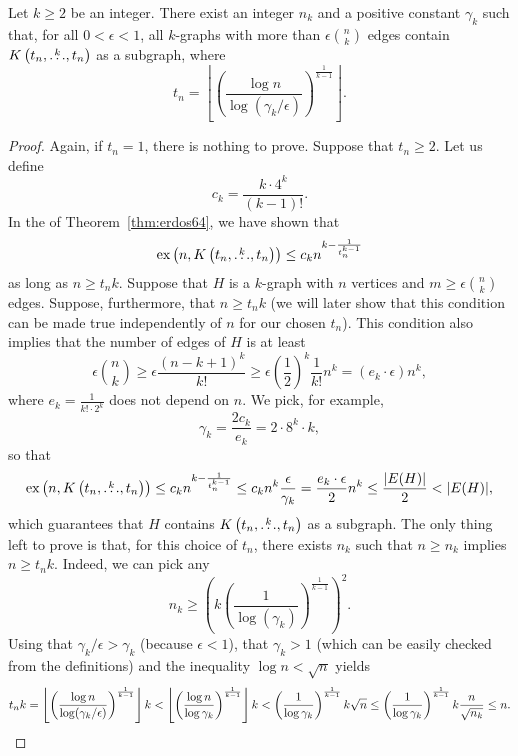 \begin{theorem} \label{thm:erdos64-constant-density}
    Let $k \geq 2$ be an integer.
    There exist an integer $n_k$ and a positive constant $\gamma_k$
    such that, for all
    $0 < \epsilon < 1$,
    all $k$-graphs with more than $\epsilon \binom{n}{k}$ edges
    contain $K\left(t_n, \overset{k}{\dots}, t_n\right)$ as a subgraph, where
    \[
        t_n = \left\lfloor \left( \frac{\log n}{\log(\gamma_k/\epsilon)} \right)^{\frac{1}{k-1}} \right\rfloor.
    \]
    \begin{proof}
        Again, if $t_n=1$, there is nothing to prove.
        Suppose that $t_n \geq 2$.
        Let us define
        \[
            c_k = \frac{k \cdot 4^k}{(k-1)!}.
        \]
        In the  of Theorem~\ref{thm:erdos64}, we have shown that
        \[
            \text{ex} \left( n, K\left(t_n, \overset{k}{\dots}, t_n\right) \right) \leq c_k n^{k - \frac{1}{t_n^{k-1}}}
        \]
        as long as $n \geq t_n k$.
        Suppose that $H$ is a $k$-graph with $n$ vertices and $m \geq \epsilon \binom{n}{k}$ edges.
        Suppose, furthermore, that $n \geq t_n k$
        (we will later show that this condition can be made true independently of $n$ for our chosen $t_n$).
        This condition also implies that the number of edges of $H$ is at least
        \[
            \epsilon \binom{n}{k} \geq \epsilon \frac{(n - k + 1)^k}{k!} \geq \epsilon \left( \frac{1}{2} \right)^k \frac{1}{k!} n^{k} = (e_k  \cdot \epsilon) n^{k},
        \]
        where $e_k = \frac{1}{k! \cdot 2^k}$ does not depend on $n$.
        We pick, for example,
        \[
             \gamma_k = \frac{2c_k}{e_k} = 2 \cdot 8^k \cdot k,
        \]
        so that
        \[
            \text{ex} \left( n, K\left(t_n, \overset{k}{\dots}, t_n\right) \right) \leq c_k n^{k - \frac{1}{t_n^{k-1}}} \leq c_k n^k  \frac{\epsilon}{\gamma_k}
            = \frac{e_k \cdot \epsilon}{2} n^{k} \leq  \frac{|E(H)|}{2} < |E(H)|,
        \]
        which guarantees that $H$ contains $K\left(t_n, \overset{k}{\dots}, t_n\right)$ as a subgraph.
        The only thing left to prove is that, for this choice of $t_n$, there exists $n_k$
        such that $n \geq n_k$ implies $n \geq t_n k$.
        Indeed, we can pick any
        \[
            n_k \geq \left( k \left(\frac{1}{\log(\gamma_k)} \right)^{\frac{1}{k-1}}\right)^2.
        \]
        Using that $\gamma_k / \epsilon > \gamma_k$ (because $\epsilon < 1$),
        that $\gamma_k > 1$ (which can be easily checked from the definitions)
        and the inequality $\log n < \sqrt{n}$ yields
        \[
            t_n k
            = \left\lfloor \left( \frac{\log n}{\log(\gamma_k / \epsilon)} \right)^{\frac{1}{k-1}} \right\rfloor k
            < \left\lfloor \left( \frac{\log n}{\log\gamma_k} \right)^{\frac{1}{k-1}} \right\rfloor k
            <   \left( \frac{1}{\log \gamma_k} \right)^{\frac{1}{k-1}} k \sqrt{n}
            \leq \left( \frac{1}{\log \gamma_k} \right)^{\frac{1}{k-1}} k \frac{n}{\sqrt{n_k}}
            \leq n. \qedhere
        \]
    \end{proof}
\end{theorem}

